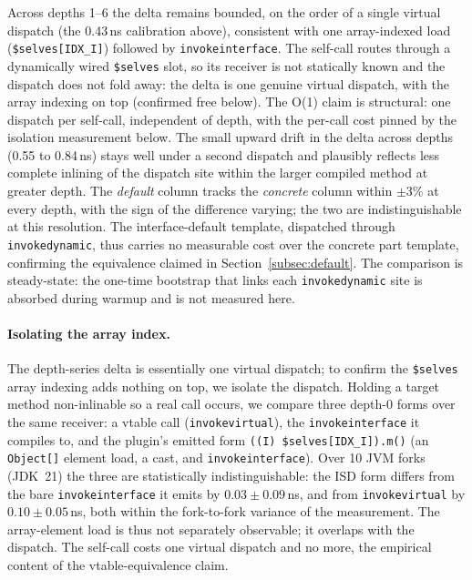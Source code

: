 \documentclass[sigplan,10pt,review,anonymous]{acmart}
\theoremstyle{acmplain}
\newcommand{\code}[1]{\texttt{#1}}
\begin{document}
\noindent
Across depths 1--6 the delta remains bounded, on the order of a single virtual
dispatch (the 0.43\,ns calibration above), consistent with one array-indexed load
(\code{\$selves[IDX\_I]}) followed by \code{invokeinterface}. The self-call routes
through a dynamically wired \code{\$selves} slot, so its receiver is not statically
known and the dispatch does not fold away: the delta is one genuine virtual
dispatch, with the array indexing on top (confirmed free below). The O(1) claim is
structural: one dispatch per self-call, independent of depth, with the per-call
cost pinned by the isolation measurement below. The small upward drift in the
delta across depths (0.55 to 0.84\,ns) stays well under a second dispatch and
plausibly reflects less complete inlining of the dispatch site within the larger
compiled method at greater depth. The \emph{default} column tracks the \emph{concrete}
column within $\pm$3\% at every depth, with the sign of the difference varying;
the two are indistinguishable at this resolution. The interface-default template,
dispatched through \code{invokedynamic}, thus carries no measurable cost over the
concrete part template, confirming the equivalence claimed in
Section~\ref{subsec:default}. The comparison is steady-state: the one-time
bootstrap that links each \code{invokedynamic} site is absorbed during warmup and
is not measured here.

\paragraph{Isolating the array index.}
The depth-series delta is essentially one virtual dispatch; to confirm the
\code{\$selves} array indexing adds nothing on top, we isolate the dispatch.
Holding a target method non-inlinable so a real call occurs, we compare three
depth-0 forms over the same receiver: a vtable call (\code{invokevirtual}), the
\code{invokeinterface} it compiles to, and the plugin's emitted form
\code{((I)\,\$selves[IDX\_I]).m()} (an \code{Object[]} element load, a cast, and
\code{invokeinterface}). Over 10 JVM forks (JDK~21) the three are statistically
indistinguishable: the ISD form differs from the bare \code{invokeinterface} it
emits by $0.03\pm0.09$\,ns, and from \code{invokevirtual} by $0.10\pm0.05$\,ns,
both within the fork-to-fork variance of the measurement. The array-element load
is thus not separately observable; it overlaps with the dispatch. The self-call
costs one virtual dispatch and no more, the empirical content of the
vtable-equivalence claim.
\end{document}
